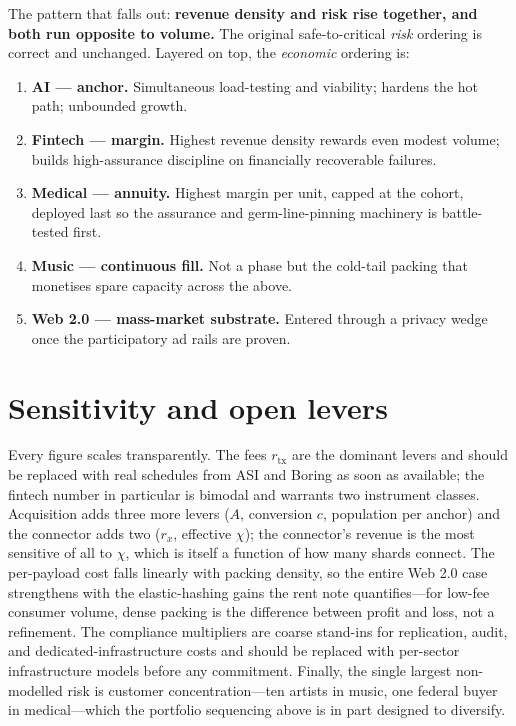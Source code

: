 \documentclass[11pt]{article}
\begin{document}
The pattern that falls out: \textbf{revenue density and risk rise together, and both run opposite to volume.} The original safe-to-critical \emph{risk} ordering is correct and unchanged. Layered on top, the \emph{economic} ordering is:

\begin{enumerate}[leftmargin=1.6em,itemsep=2pt]
  \item \textbf{AI --- anchor.} Simultaneous load-testing and viability; hardens the hot path; unbounded growth.
  \item \textbf{Fintech --- margin.} Highest revenue density rewards even modest volume; builds high-assurance discipline on financially recoverable failures.
  \item \textbf{Medical --- annuity.} Highest margin per unit, capped at the cohort, deployed last so the assurance and germ-line-pinning machinery is battle-tested first.
  \item \textbf{Music --- continuous fill.} Not a phase but the cold-tail packing that monetises spare capacity across the above.
  \item \textbf{Web 2.0 --- mass-market substrate.} Entered through a privacy wedge once the participatory ad rails are proven.
\end{enumerate}

\section{Sensitivity and open levers}
\label{sec:sensitivity}

Every figure scales transparently. The fees $r_{\text{tx}}$ are the dominant levers and should be replaced with real schedules from ASI and Boring as soon as available; the fintech number in particular is bimodal and warrants two instrument classes. Acquisition adds three more levers ($A$, conversion $c$, population per anchor) and the connector adds two ($r_x$, effective $\chi$); the connector's revenue is the most sensitive of all to $\chi$, which is itself a function of how many shards connect. The per-payload cost falls linearly with packing density, so the entire Web 2.0 case strengthens with the elastic-hashing gains the rent note quantifies---for low-fee consumer volume, dense packing is the difference between profit and loss, not a refinement. The compliance multipliers are coarse stand-ins for replication, audit, and dedicated-infrastructure costs and should be replaced with per-sector infrastructure models before any commitment. Finally, the single largest non-modelled risk is customer concentration---ten artists in music, one federal buyer in medical---which the portfolio sequencing above is in part designed to diversify.
\end{document}
